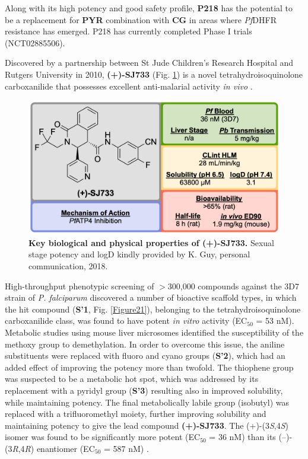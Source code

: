 \documentclass[twocolumn]{bmcart}%
\begin{document}
Along with its high potency and good safety profile, \textbf{P218} has the potential to be a replacement for \textbf{PYR} combination with \textbf{CG} in areas where \textit{Pf}DHFR resistance has emerged. P218 has currently completed Phase I trials (NCT02885506).

\hrulefill

Discovered by a partnership between St Jude Children's Research Hospital and Rutgers University in 2010, \textbf{(+)-SJ733} (Fig. \ref{Figure20}) is a novel tetrahydroisoquinolone carboxanilide that possesses excellent anti-malarial activity \textit{in vivo} \cite{Guiguemde2010}.

\begin{figure}[h]
	\includegraphics [scale=0.575] {Figure20}
	\caption{{\bf Key biological and physical properties of (+)-SJ733.} Sexual stage potency and logD kindly provided by K. Guy, personal communication, 2018.}
	\label{Figure20}
\end{figure}

High-throughput phenotypic screening of $>$300,000 compounds against the 3D7 strain of \textit{P. falciparum} discovered a number of bioactive scaffold types, in which the hit compound (\textbf{S'1}, Fig. \ref{Figure21}), belonging to the tetrahydroisoquinolone carboxanilide class, was found to have potent \textit{in vitro} activity (EC$_{50}$ = 53 nM). Metabolic studies using mouse liver microsomes identified the susceptibility of the methoxy group to demethylation. In order to overcome this issue, the aniline substituents were replaced with fluoro and cyano groups (\textbf{S'2}), which had an added effect of improving the potency more than twofold. The thiophene group was suspected to be a metabolic hot spot, which was addressed by its replacement with a pyridyl group (\textbf{S'3}) resulting also in improved solubility, while maintaining potency. The final metabolically labile group (isobutyl) was replaced with a trifluoromethyl moiety, further improving solubility and maintaining potency to give the lead compound \textbf{(+)-SJ733}. The (+)-(3\textit{S},4\textit{S}) isomer was found to be significantly more potent (EC$_{50}$ = 36 nM) than its (--)-(3\textit{R},4\textit{R}) enantiomer (EC$_{50}$ = 587 nM) \cite{Floyd2016}.
\end{document}
